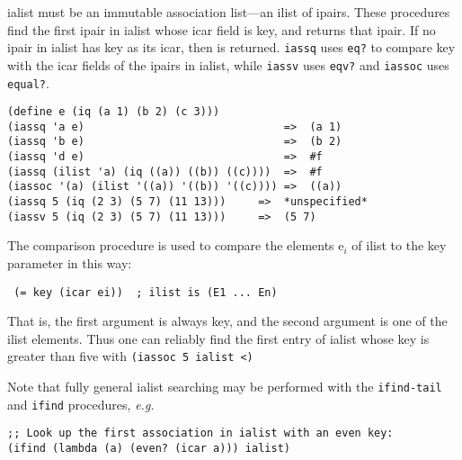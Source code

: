 \begin{entry}{%
  }

  ialist must
  be an immutable association list---an ilist of ipairs.  These
  procedures find the first ipair in ialist whose icar field is key,
  and returns that ipair. If no ipair in ialist has key as its icar,
  then \schfalse{} is returned. \texttt{iassq} uses \texttt{eq?} to
  compare key with the icar fields of the ipairs in ialist, while
  \texttt{iassv} uses \texttt{eqv?} and \texttt{iassoc} uses
  \texttt{equal?}.

\begin{verbatim}
(define e (iq (a 1) (b 2) (c 3)))
(iassq 'a e)                               =>  (a 1)
(iassq 'b e)                               =>  (b 2)
(iassq 'd e)                               =>  #f
(iassq (ilist 'a) (iq ((a)) ((b)) ((c))))  =>  #f
(iassoc '(a) (ilist '((a)) '((b)) '((c)))) =>  ((a))
(iassq 5 (iq (2 3) (5 7) (11 13)))     =>  *unspecified*
(iassv 5 (iq (2 3) (5 7) (11 13)))     =>  (5 7)
\end{verbatim}

  The comparison procedure is used to compare the elements e$_i$ of
  ilist to the key parameter in this way:

  \texttt{\ (=\ key\ (icar\ ei))\ \ ;\ ilist\ is\ (E1\ ...\ En)}

  That is, the first argument is always key, and the second argument
  is one of the ilist elements. Thus one can reliably find the first
  entry of ialist whose key is greater than five with \texttt{(iassoc\
    5\ ialist\ \textless{})}

  Note that fully general ialist searching may be performed with the
  \texttt{ifind-tail} and \texttt{ifind} procedures, \emph{e.g.}

\begin{verbatim}
;; Look up the first association in ialist with an even key:
(ifind (lambda (a) (even? (icar a))) ialist)
\end{verbatim}
\end{entry}

